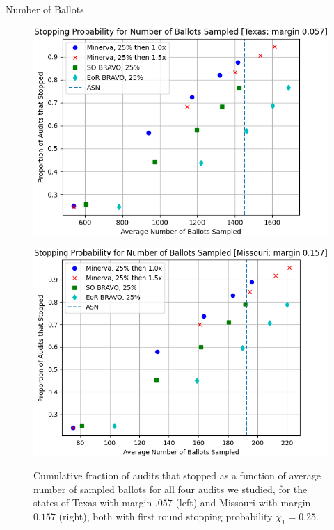 \documentclass[final]{beamer}
\newlength{\colwidth}
\begin{document}
\begin{frame}[t]
\begin{columns}[t]
\begin{column}{\colwidth}
\begin{block}{Number of Ballots}
\begin{figure}[h]
\centering
\begin{minipage}{.49\textwidth}
\includegraphics[width=1\textwidth]{texas25.png}
\label{fig:texas_25}
\end{minipage}
\begin{minipage}{.49\textwidth}
\includegraphics[width=1\textwidth]{missouri25.png}
\label{fig:missouri_25}
\end{minipage}
\caption{Cumulative fraction of audits that stopped as a function of average number of sampled ballots for all four audits we studied, for the states of Texas with margin $.057$ (left) and Missouri with margin $0.157$ (right), both with first round stopping probability $\chi_1=0.25$.}
\end{figure}


\end{block}
\end{column}
\end{columns}
\end{frame}
\end{document}
